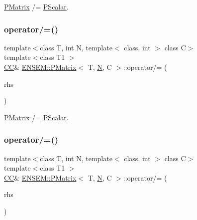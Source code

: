 \mbox{\hyperlink{classENSEM_1_1PMatrix}{P\+Matrix}} /= \mbox{\hyperlink{classENSEM_1_1PScalar}{P\+Scalar}}. 

\mbox{\label{classENSEM_1_1PMatrix_ade8246cb542a62e3368d33026885ca59}} 
\subsubsection{\texorpdfstring{operator/=()}{operator/=()}\hspace{0.1cm}{\footnotesize\ttfamily [2/3]}}
{\footnotesize\ttfamily template$<$class T, int N, template$<$ class, int $>$ class C$>$ \\
template$<$class T1 $>$ \\
\mbox{\hyperlink{classENSEM_1_1PMatrix_a744bac549029029effe32dc1705660ec}{CC}}\& \mbox{\hyperlink{classENSEM_1_1PMatrix}{E\+N\+S\+E\+M\+::\+P\+Matrix}}$<$ T, \mbox{\hyperlink{adat__devel_2lib_2hadron_2operator__name__util_8cc_a7722c8ecbb62d99aee7ce68b1752f337}{N}}, C $>$\+::operator/= (\begin{DoxyParamCaption}\item[{const \mbox{\hyperlink{classENSEM_1_1PScalar}{P\+Scalar}}$<$ T1 $>$ \&}]{rhs }\end{DoxyParamCaption})\hspace{0.3cm}{\ttfamily [inline]}}



\mbox{\hyperlink{classENSEM_1_1PMatrix}{P\+Matrix}} /= \mbox{\hyperlink{classENSEM_1_1PScalar}{P\+Scalar}}. 

\mbox{\label{classENSEM_1_1PMatrix_ade8246cb542a62e3368d33026885ca59}} 
\subsubsection{\texorpdfstring{operator/=()}{operator/=()}\hspace{0.1cm}{\footnotesize\ttfamily [3/3]}}
{\footnotesize\ttfamily template$<$class T, int N, template$<$ class, int $>$ class C$>$ \\
template$<$class T1 $>$ \\
\mbox{\hyperlink{classENSEM_1_1PMatrix_a744bac549029029effe32dc1705660ec}{CC}}\& \mbox{\hyperlink{classENSEM_1_1PMatrix}{E\+N\+S\+E\+M\+::\+P\+Matrix}}$<$ T, \mbox{\hyperlink{adat__devel_2lib_2hadron_2operator__name__util_8cc_a7722c8ecbb62d99aee7ce68b1752f337}{N}}, C $>$\+::operator/= (\begin{DoxyParamCaption}\item[{const \mbox{\hyperlink{classENSEM_1_1PScalar}{P\+Scalar}}$<$ T1 $>$ \&}]{rhs }\end{DoxyParamCaption})\hspace{0.3cm}{\ttfamily [inline]}}



